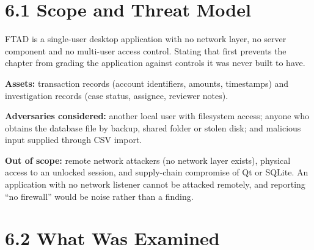 \documentclass[
  12pt,
]{report}
\begin{document}
\section{6.1 Scope and Threat Model}\label{scope-and-threat-model}

FTAD is a single-user desktop application with no network layer, no
server component and no multi-user access control. Stating that first
prevents the chapter from grading the application against controls it
was never built to have.

\textbf{Assets:} transaction records (account identifiers, amounts,
timestamps) and investigation records (case status, assignee, reviewer
notes).

\textbf{Adversaries considered:} another local user with filesystem
access; anyone who obtains the database file by backup, shared folder or
stolen disk; and malicious input supplied through CSV import.

\textbf{Out of scope:} remote network attackers (no network layer
exists), physical access to an unlocked session, and supply-chain
compromise of Qt or SQLite. An application with no network listener
cannot be attacked remotely, and reporting ``no firewall'' would be
noise rather than a finding.

\section{6.2 What Was Examined}\label{what-was-examined}
\end{document}

